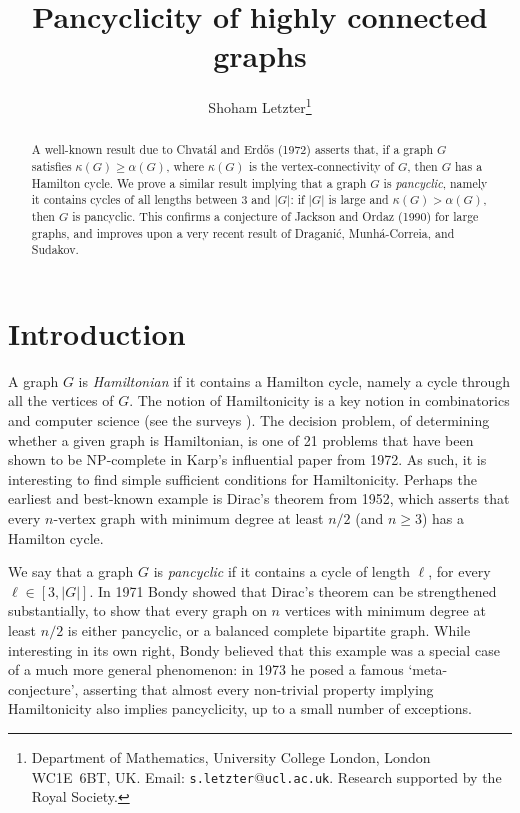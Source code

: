\documentclass[11pt,english]{article}
\theoremstyle{plain}
\theoremstyle{definition}
\theoremstyle{remark}
\begin{document}
\title{Pancyclicity of highly connected graphs}
\author{Shoham Letzter\thanks{
		Department of Mathematics, 
		University College London, 
		London WC1E~6BT, UK. 
		Email: \texttt{s.letzter}@\texttt{ucl.ac.uk}. 
		Research supported by the Royal Society.
	}
}

\date{}
\maketitle


\begin{abstract}

	\setlength{\parskip}{\medskipamount}
    \setlength{\parindent}{0pt}
    \noindent

	A well-known result due to Chvat\'al and Erd\H{o}s (1972) asserts that, if a graph $G$ satisfies $\kappa(G) \ge \alpha(G)$, where $\kappa(G)$ is the vertex-connectivity of $G$, then $G$ has a Hamilton cycle. We prove a similar result implying that a graph $G$ is \emph{pancyclic}, namely it contains cycles of all lengths between $3$ and $|G|$: if $|G|$ is large and $\kappa(G) > \alpha(G)$, then $G$ is pancyclic. This confirms a conjecture of Jackson and Ordaz (1990) for large graphs, and improves upon a very recent result of Dragani\'c, Munh\'a-Correia, and Sudakov.

\end{abstract}

\section{Introduction} \label{sec:intro}

	A graph $G$ is \emph{Hamiltonian} if it contains a Hamilton cycle, namely a cycle through all the vertices of $G$. The notion of Hamiltonicity is a key notion in combinatorics and computer science (see the surveys \cite{kuhn2014hamilton,gould2014recent}). The decision problem, of determining whether a given graph is Hamiltonian, is one of 21 problems that have been shown to be NP-complete in Karp's influential paper \cite{karp1972reducibility} from 1972. As such, it is interesting to find simple sufficient conditions for Hamiltonicity. Perhaps the earliest and best-known example is Dirac's theorem \cite{dirac1952some} from 1952, which asserts that every $n$-vertex graph with minimum degree at least $n/2$ (and $n \ge 3$) has a Hamilton cycle.

	We say that a graph $G$ is \emph{pancyclic} if it contains a cycle of length $\ell$, for every $\ell \in [3,|G|]$.
	In 1971 Bondy \cite{bondy1971pancyclic} showed that Dirac's theorem can be strengthened substantially, to show that every graph on $n$ vertices with minimum degree at least $n/2$ is either pancyclic, or a balanced complete bipartite graph. While interesting in its own right, Bondy believed that this example was a special case of a much more general phenomenon: in 1973 he \cite{bondy1973pancyclic} posed a famous `meta-conjecture', asserting that almost every non-trivial property implying Hamiltonicity also implies pancyclicity, up to a small number of exceptions.
\end{document}
